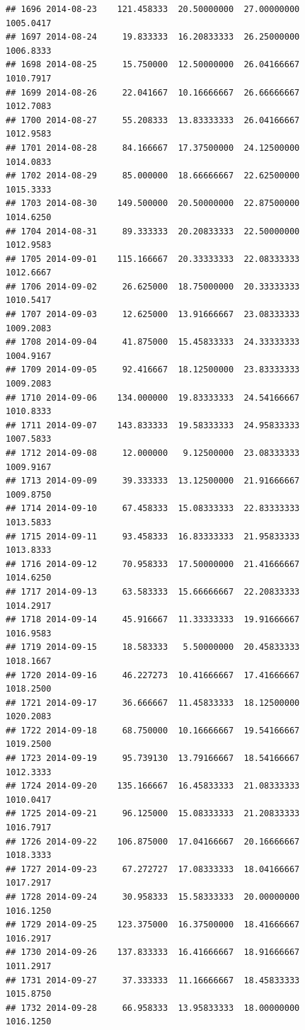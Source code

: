 \documentclass[
]{article}
\begin{document}
\begin{verbatim}
## 1696 2014-08-23    121.458333  20.50000000  27.00000000    1005.0417
## 1697 2014-08-24     19.833333  16.20833333  26.25000000    1006.8333
## 1698 2014-08-25     15.750000  12.50000000  26.04166667    1010.7917
## 1699 2014-08-26     22.041667  10.16666667  26.66666667    1012.7083
## 1700 2014-08-27     55.208333  13.83333333  26.04166667    1012.9583
## 1701 2014-08-28     84.166667  17.37500000  24.12500000    1014.0833
## 1702 2014-08-29     85.000000  18.66666667  22.62500000    1015.3333
## 1703 2014-08-30    149.500000  20.50000000  22.87500000    1014.6250
## 1704 2014-08-31     89.333333  20.20833333  22.50000000    1012.9583
## 1705 2014-09-01    115.166667  20.33333333  22.08333333    1012.6667
## 1706 2014-09-02     26.625000  18.75000000  20.33333333    1010.5417
## 1707 2014-09-03     12.625000  13.91666667  23.08333333    1009.2083
## 1708 2014-09-04     41.875000  15.45833333  24.33333333    1004.9167
## 1709 2014-09-05     92.416667  18.12500000  23.83333333    1009.2083
## 1710 2014-09-06    134.000000  19.83333333  24.54166667    1010.8333
## 1711 2014-09-07    143.833333  19.58333333  24.95833333    1007.5833
## 1712 2014-09-08     12.000000   9.12500000  23.08333333    1009.9167
## 1713 2014-09-09     39.333333  13.12500000  21.91666667    1009.8750
## 1714 2014-09-10     67.458333  15.08333333  22.83333333    1013.5833
## 1715 2014-09-11     93.458333  16.83333333  21.95833333    1013.8333
## 1716 2014-09-12     70.958333  17.50000000  21.41666667    1014.6250
## 1717 2014-09-13     63.583333  15.66666667  22.20833333    1014.2917
## 1718 2014-09-14     45.916667  11.33333333  19.91666667    1016.9583
## 1719 2014-09-15     18.583333   5.50000000  20.45833333    1018.1667
## 1720 2014-09-16     46.227273  10.41666667  17.41666667    1018.2500
## 1721 2014-09-17     36.666667  11.45833333  18.12500000    1020.2083
## 1722 2014-09-18     68.750000  10.16666667  19.54166667    1019.2500
## 1723 2014-09-19     95.739130  13.79166667  18.54166667    1012.3333
## 1724 2014-09-20    135.166667  16.45833333  21.08333333    1010.0417
## 1725 2014-09-21     96.125000  15.08333333  21.20833333    1016.7917
## 1726 2014-09-22    106.875000  17.04166667  20.16666667    1018.3333
## 1727 2014-09-23     67.272727  17.08333333  18.04166667    1017.2917
## 1728 2014-09-24     30.958333  15.58333333  20.00000000    1016.1250
## 1729 2014-09-25    123.375000  16.37500000  18.41666667    1016.2917
## 1730 2014-09-26    137.833333  16.41666667  18.91666667    1011.2917
## 1731 2014-09-27     37.333333  11.16666667  18.45833333    1015.8750
## 1732 2014-09-28     66.958333  13.95833333  18.00000000    1016.1250

\end{verbatim}
\end{document}
